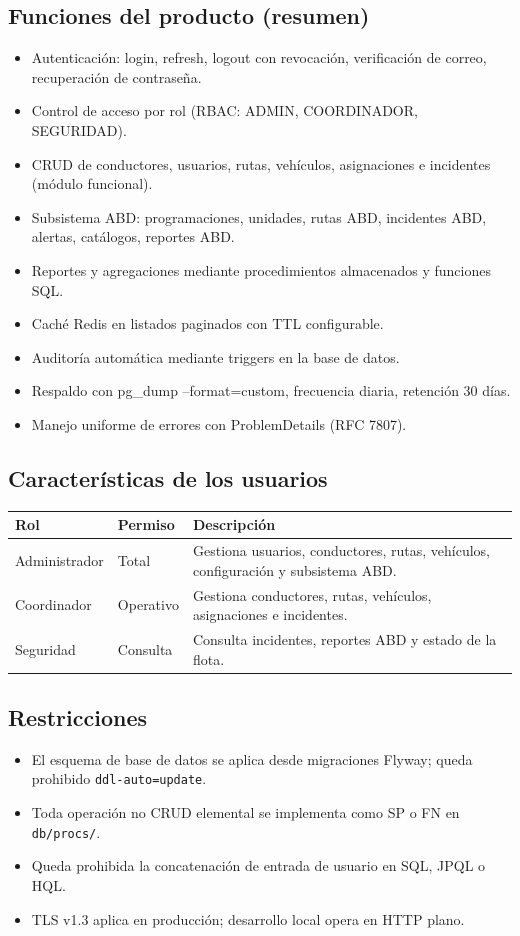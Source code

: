 \documentclass[12pt,a4paper]{article}
\begin{document}
\subsection{Funciones del producto (resumen)}
\begin{itemize}
  \item Autenticación: login, refresh, logout con revocación, verificación de correo, recuperación de contraseña.
  \item Control de acceso por rol (RBAC: ADMIN, COORDINADOR, SEGURIDAD).
  \item CRUD de conductores, usuarios, rutas, vehículos, asignaciones e incidentes (módulo funcional).
  \item Subsistema ABD: programaciones, unidades, rutas ABD, incidentes ABD, alertas, catálogos, reportes ABD.
  \item Reportes y agregaciones mediante procedimientos almacenados y funciones SQL.
  \item Caché Redis en listados paginados con TTL configurable.
  \item Auditoría automática mediante triggers en la base de datos.
  \item Respaldo con pg\_dump --format=custom, frecuencia diaria, retención 30 días.
  \item Manejo uniforme de errores con ProblemDetails (RFC 7807).
\end{itemize}

\subsection{Características de los usuarios}
\begin{longtable}{@{}p{3cm}p{3.5cm}p{8cm}@{}}
\toprule
\textbf{Rol} & \textbf{Permiso} & \textbf{Descripción} \\
\midrule
\endhead
Administrador & Total & Gestiona usuarios, conductores, rutas, vehículos, configuración y subsistema ABD. \\
Coordinador & Operativo & Gestiona conductores, rutas, vehículos, asignaciones e incidentes. \\
Seguridad & Consulta & Consulta incidentes, reportes ABD y estado de la flota. \\
\bottomrule
\end{longtable}

\subsection{Restricciones}
\begin{itemize}
  \item El esquema de base de datos se aplica desde migraciones Flyway; queda prohibido \texttt{ddl-auto=update}.
  \item Toda operación no CRUD elemental se implementa como SP o FN en \texttt{db/procs/}.
  \item Queda prohibida la concatenación de entrada de usuario en SQL, JPQL o HQL.
  \item TLS v1.3 aplica en producción; desarrollo local opera en HTTP plano.
\end{itemize}
\end{document}
